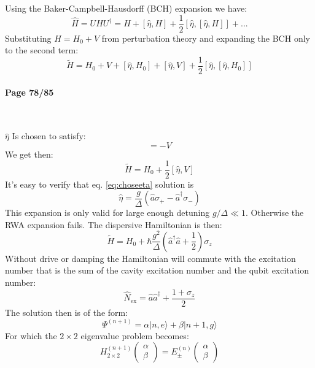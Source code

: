 \documentclass[12pt]{article}
\numberwithin{equation}{subsection}
\newcommand\page[1]{
{
\color{blue}\paragraph{
Page #1
}\mbox{}\\
}
}
\begin{document}
Using the Baker-Campbell-Hausdorff (BCH) expansion we have:
\begin{equation}
    \hat H = UHU^\dagger = H + [\hat \eta, H] + \frac{1}{2} [\hat \eta , [\hat \eta, H]]+ ...
\end{equation}
Substituting $H= H_0+V$ from perturbation theory and expanding the BCH only to the second term:
\begin{equation}
    \tilde H =H_0 + V+[\hat \eta, H_0]+[\hat \eta, V] + \frac{1}{2} [\hat \eta , [\hat \eta, H_0]]
\end{equation}

\page{78/85}

$\hat \eta$ Is chosen to satisfy:
\begin{equation}
  [\hat \eta, H_0] = -V  
  \label{eq:choseeta}
\end{equation}
We get then:
\begin{equation}
    \tilde H = H_0 + \frac{1}{2} [\hat \eta, V]
\end{equation}
It's easy to verify that eq. \ref{eq:choseeta} solution is
\begin{equation}
    \hat \eta = \frac{g}{\Delta} (\hat a \sigma_+ - \hat a^\dagger \sigma_-)
\end{equation}
This expansion is only valid for large enough detuning $g/\Delta \ll 1$. Otherwise the RWA expansion fails. The dispersive Hamiltonian is then:
\begin{equation}
    \tilde H = H_0 + \hbar \frac{g^2}{\Delta} \left( \hat a ^\dagger \hat a + \frac{1}{2} \right ) \sigma_z
    \label{eq:dispersiveH}
\end{equation}
Without drive or damping the Hamiltonian will commute with the excitation number that is the sum of the cavity excitation number and the qubit excitation number:
\begin{equation}
    \hat N _{\textrm{ex}} = \hat a \hat a ^\dagger + \frac{1+\sigma_z}{2}
\end{equation}
The solution then is of the form:
\begin{equation}
    \Psi^{(n+1)} = \alpha |n,e\rangle + \beta | n+1, g\rangle
\end{equation}
For which the $2\times 2$ eigenvalue problem becomes:
\begin{equation}
    H^{(n+1)}_{2\times 2} \begin{pmatrix}
    \alpha \\
    \beta
    \end{pmatrix}
    =E^{(n)}_\pm \begin{pmatrix}
    \alpha \\
    \beta
    \end{pmatrix}
\end{equation}
\end{document}
